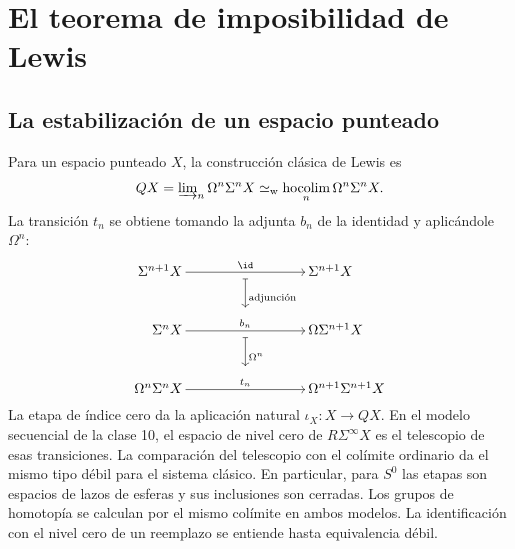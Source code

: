 \section{El teorema de imposibilidad de Lewis}

\subsection{La estabilización de un espacio punteado}

Para un espacio punteado $X$, la construcción clásica de Lewis es
\[
QX=\varinjlim\nolimits_n\Omega^n\Sigma^n X
\simeq_{\mathrm w}\operatorname*{hocolim}_n\Omega^n\Sigma^n X .
\]
La transición $t_n$ se obtiene tomando la adjunta $b_n$ de la identidad y aplicándole $\Omega^n$:
\[
\begin{tikzcd}[column sep={15mm,between origins},row sep={14.8mm,between origins},
    cells={nodes={inner sep=2pt}}]
|[anchor=east]| \Sigma^{n+1}X\arrow[rr,start anchor=east,end anchor=west,"\id"]
& {}\arrow[d,mapsto,start anchor=center,end anchor=center,shorten <=2.5mm,shorten >=5mm,
    "\text{adjunción}"]
& |[anchor=west]| \Sigma^{n+1}X\\
|[anchor=east]| \Sigma^nX\arrow[rr,start anchor=east,end anchor=west,"b_n"]
& {}\arrow[d,mapsto,start anchor=center,end anchor=center,shorten <=2.5mm,shorten >=5mm,"\Omega^n"]
& |[anchor=west]| \Omega\Sigma^{n+1}X\\
|[anchor=east]| \Omega^n\Sigma^n X\arrow[rr,start anchor=east,end anchor=west,"t_n"]
& {}
& |[anchor=west]| \Omega^{n+1}\Sigma^{n+1}X
\end{tikzcd}
\]
La etapa de índice cero da la aplicación natural $\iota_X\colon X\to QX$. En el modelo secuencial de la clase 10, el espacio de nivel cero de $R\Sigma^\infty X$ es el telescopio de esas transiciones. La comparación del telescopio con el colímite ordinario da el mismo tipo débil para el sistema clásico. En particular, para $S^0$ las etapas son espacios de lazos de esferas y sus inclusiones son cerradas. Los grupos de homotopía se calculan por el mismo colímite en ambos modelos. La identificación con el nivel cero de un reemplazo se entiende hasta equivalencia débil.


